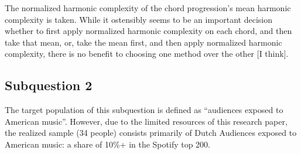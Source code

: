 The normalized harmonic complexity of the chord progression's mean harmonic complexity is taken. While it ostensibly seems to be an important decision whether to first apply normalized harmonic complexity on each chord, and then take that mean, or, take the mean first, and then apply normalized harmonic complexity, there is no benefit to choosing one method over the other [I think].


\subsection{Subquestion 2 \qII}
The target population of this subquestion is defined as ``audiences exposed to American music''. However, due to the limited resources of this research paper, the realized sample (34 people) consists primarily of Dutch 
Audiences exposed to American music: a share of 10\%+ in the Spotify top 200.
